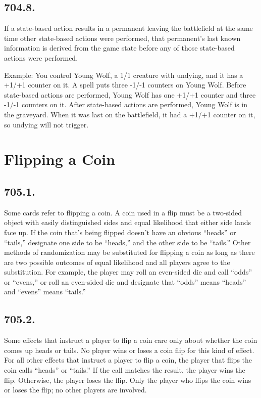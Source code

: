 \subsection*{704.8.}
If a state-based action results in a permanent leaving the battlefield at the same time other state-based actions were performed, that permanent’s last known information is derived from the game state before any of those state-based actions were performed.

Example: You control Young Wolf, a 1/1 creature with undying, and it has a +1/+1 counter on it. A spell puts three -1/-1 counters on Young Wolf. Before state-based actions are performed, Young Wolf has one +1/+1 counter and three -1/-1 counters on it. After state-based actions are performed, Young Wolf is in the graveyard. When it was last on the battlefield, it had a +1/+1 counter on it, so undying will not trigger.

\section{Flipping a Coin}
\subsection*{705.1.}
Some cards refer to flipping a coin. A coin used in a flip must be a two-sided object with easily distinguished sides and equal likelihood that either side lands face up. If the coin that’s being flipped doesn’t have an obvious “heads” or “tails,” designate one side to be “heads,” and the other side to be “tails.” Other methods of randomization may be substituted for flipping a coin as long as there are two possible outcomes of equal likelihood and all players agree to the substitution. For example, the player may roll an even-sided die and call “odds” or “evens,” or roll an even-sided die and designate that “odds” means “heads” and “evens” means “tails.”

\subsection*{705.2.}
Some effects that instruct a player to flip a coin care only about whether the coin comes up heads or tails. No player wins or loses a coin flip for this kind of effect. For all other effects that instruct a player to flip a coin, the player that flips the coin calls “heads” or “tails.” If the call matches the result, the player wins the flip. Otherwise, the player loses the flip. Only the player who flips the coin wins or loses the flip; no other players are involved.

